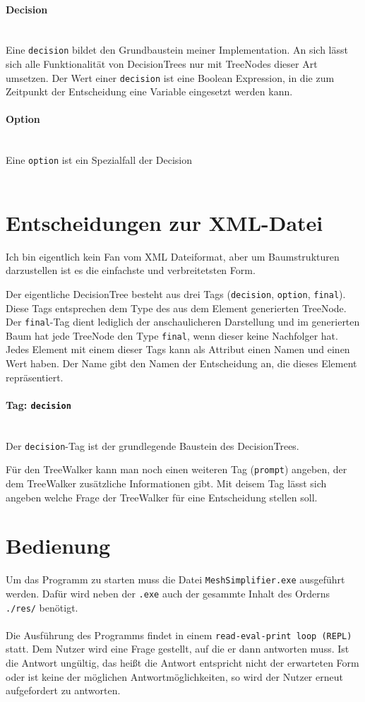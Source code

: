 \documentclass[a4paper,12pt]{article}
\newcommand{\myparagraph}[1]{\paragraph*{#1}\mbox{}\\}
\begin{document}
\myparagraph{Decision}
Eine \texttt{decision} bildet den Grundbaustein meiner Implementation. An sich lässt sich alle Funktionalität von DecisionTrees nur mit TreeNodes dieser Art umsetzen.
Der Wert einer \texttt{decision} ist eine Boolean Expression, in die zum Zeitpunkt der Entscheidung eine Variable eingesetzt werden kann. 

\myparagraph{Option}
Eine \texttt{option} ist ein Spezialfall der Decision
\\
\\


\section*{Entscheidungen zur XML-Datei}
Ich bin eigentlich kein Fan vom XML Dateiformat, aber um Baumstrukturen darzustellen ist es die einfachste und verbreitetsten Form.

Der eigentliche DecisionTree besteht aus drei Tags (\texttt{decision}, \texttt{option}, \texttt{final}).
Diese Tags entsprechen dem Type des aus dem Element generierten TreeNode.
Der \texttt{final}-Tag dient lediglich der anschaulicheren Darstellung und im generierten Baum hat jede TreeNode den Type \texttt{final}, wenn dieser keine Nachfolger hat.
Jedes Element mit einem dieser Tags kann als Attribut einen Namen und einen Wert haben.
Der Name gibt den Namen der Entscheidung an, die dieses Element repräsentiert. 

\myparagraph{Tag: \texttt{decision}}
Der \verb+decision+-Tag ist der grundlegende Baustein des DecisionTrees. 

Für den TreeWalker kann man noch einen weiteren Tag (\verb+prompt+) angeben, der dem TreeWalker zusätzliche Informationen gibt. Mit deisem Tag lässt sich angeben welche Frage der TreeWalker für eine Entscheidung stellen soll. 


\newpage
\section*{Bedienung}

Um das Programm zu starten muss die Datei \texttt{MeshSimplifier.exe} ausgeführt werden. Dafür wird neben der \texttt{.exe} auch der gesammte Inhalt des Orderns \texttt{./res/} benötigt.
\\
\\
Die Ausführung des Programms findet in einem \texttt{read-eval-print loop (REPL)} statt. Dem Nutzer wird eine Frage gestellt, auf die er dann antworten muss. Ist die Antwort ungültig, das heißt die Antwort entspricht nicht der erwarteten Form oder ist keine der möglichen Antwortmöglichkeiten, so wird der Nutzer erneut aufgefordert zu antworten. 
\end{document}
